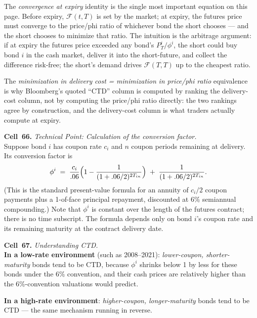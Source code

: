 The \emph{convergence at expiry} identity is the single most important
equation on this page. Before expiry, $\mathcal{F}(t,T)$ is set by the
market; at expiry, the futures price must converge to the price/phi ratio
of whichever bond the short chooses --- and the short chooses to minimize
that ratio. The intuition is the arbitrage argument: if at expiry the
futures price exceeded any bond's $P^i_T/\phi^i$, the short could buy bond
$i$ in the cash market, deliver it into the short-future, and collect the
difference risk-free; the short's demand drives $\mathcal{F}(T,T)$ up to
the cheapest ratio.

The \emph{minimization in delivery cost = minimization in price/phi ratio}
equivalence is why Bloomberg's quoted ``CTD'' column is computed by
ranking the delivery-cost column, not by computing the price/phi ratio
directly: the two rankings agree by construction, and the delivery-cost
column is what traders actually compute at expiry.

\begin{keyblock}
\textbf{Cell~66.} \emph{Technical Point: Calculation of the conversion factor.}\\
Suppose bond $i$ has coupon rate $c_i$ and $n$ coupon periods remaining at
delivery. Its conversion factor is
\[
   \phi^i \;=\; \frac{c_i}{.06}\Bigl(1 - \frac{1}{(1+.06/2)^{2T_{in}}}\Bigr)
              \;+\; \frac{1}{(1+.06/2)^{2T_{in}}}.
\]
(This is the standard present-value formula for an annuity of $c_i/2$
coupon payments plus a 1-of-face principal repayment, discounted at 6\%
semiannual compounding.) Note that $\phi^i$ is constant over the length of
the futures contract; there is no time subscript. The formula depends
only on bond $i$'s coupon rate and its remaining maturity at the contract
delivery date.
\end{keyblock}

\begin{keyblock}
\textbf{Cell~67.} \emph{Understanding CTD.}\\
\textbf{In a low-rate environment} (such as 2008--2021): \emph{lower-coupon,
shorter-maturity} bonds tend to be CTD, because $\phi^i$ shrinks below 1
by less for these bonds under the 6\% convention, and their cash prices
are relatively higher than the 6\%-convention valuations would predict.

\textbf{In a high-rate environment}: \emph{higher-coupon, longer-maturity}
bonds tend to be CTD --- the same mechanism running in reverse.
\end{keyblock}

